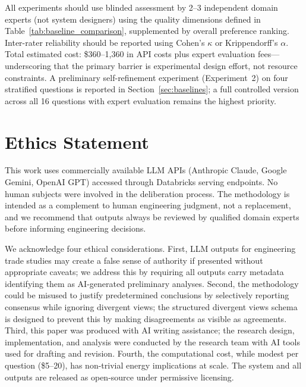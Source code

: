 \documentclass[11pt,a4paper]{article}
\begin{document}
All experiments should use blinded assessment by 2--3 independent domain experts (not system designers) using the quality dimensions defined in Table~\ref{tab:baseline_comparison}, supplemented by overall preference ranking. Inter-rater reliability should be reported using Cohen's $\kappa$ or Krippendorff's $\alpha$. Total estimated cost: \$360--1{,}360 in API costs plus expert evaluation fees---underscoring that the primary barrier is experimental design effort, not resource constraints. A preliminary self-refinement experiment (Experiment~2) on four stratified questions is reported in Section~\ref{sec:baselines}; a full controlled version across all 16 questions with expert evaluation remains the highest priority.

\section{Ethics Statement}
\label{sec:ethics}

This work uses commercially available LLM APIs (Anthropic Claude, Google Gemini, OpenAI GPT) accessed through Databricks serving endpoints. No human subjects were involved in the deliberation process. The methodology is intended as a complement to human engineering judgment, not a replacement, and we recommend that outputs always be reviewed by qualified domain experts before informing engineering decisions.

We acknowledge four ethical considerations. First, LLM outputs for engineering trade studies may create a false sense of authority if presented without appropriate caveats; we address this by requiring all outputs carry metadata identifying them as AI-generated preliminary analyses. Second, the methodology could be misused to justify predetermined conclusions by selectively reporting consensus while ignoring divergent views; the structured divergent views schema is designed to prevent this by making disagreements as visible as agreements. Third, this paper was produced with AI writing assistance; the research design, implementation, and analysis were conducted by the research team with AI tools used for drafting and revision. Fourth, the computational cost, while modest per question (\$5--20), has non-trivial energy implications at scale. The system and all outputs are released as open-source under permissive licensing.

\end{document}
